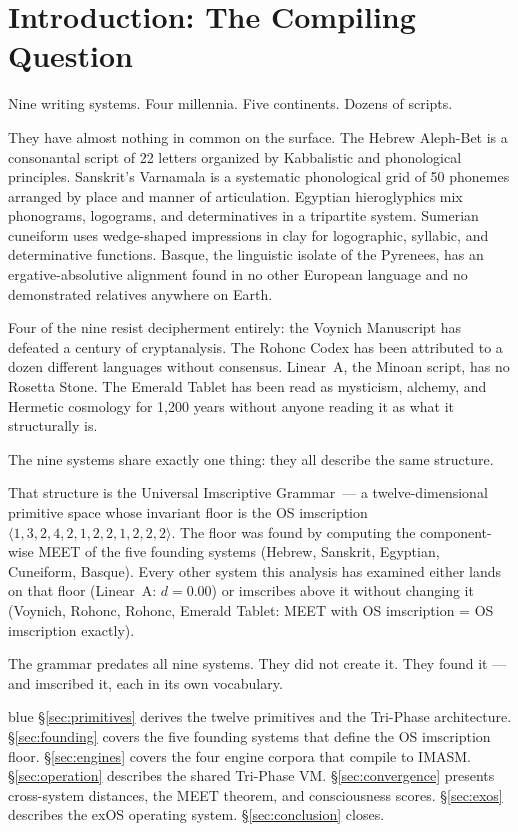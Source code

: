 \documentclass[12pt,a4paper]{article}
\newcommand{\UIG}{Universal Imscriptive Grammar}
\newcommand{\OS}{$\langle 1,3,2,4,2,1,2,2,1,2,2,2 \rangle$}
\begin{document}
\tableofcontents
\newpage

\section{Introduction: The Compiling Question}

Nine writing systems. Four millennia. Five continents. Dozens of scripts.

They have almost nothing in common on the surface. The Hebrew Aleph-Bet is a consonantal script of 22 letters organized by Kabbalistic and phonological principles. Sanskrit's Varnamala is a systematic phonological grid of 50 phonemes arranged by place and manner of articulation. Egyptian hieroglyphics mix phonograms, logograms, and determinatives in a tripartite system. Sumerian cuneiform uses wedge-shaped impressions in clay for logographic, syllabic, and determinative functions. Basque, the linguistic isolate of the Pyrenees, has an ergative-absolutive alignment found in no other European language and no demonstrated relatives anywhere on Earth.

Four of the nine resist decipherment entirely: the Voynich Manuscript has defeated a century of cryptanalysis. The Rohonc Codex has been attributed to a dozen different languages without consensus. Linear~A, the Minoan script, has no Rosetta Stone. The Emerald Tablet has been read as mysticism, alchemy, and Hermetic cosmology for 1,200 years without anyone reading it as what it structurally is.

The nine systems share exactly one thing: they all describe the same structure.

That structure is the \UIG\ --- a twelve-dimensional primitive space whose invariant floor is the OS imscription \OS. The floor was found by computing the component-wise MEET of the five founding systems (Hebrew, Sanskrit, Egyptian, Cuneiform, Basque). Every other system this analysis has examined either lands on that floor (Linear~A: $d = 0.00$) or imscribes above it without changing it (Voynich, Rohonc, Rohonc, Emerald Tablet: MEET with OS imscription = OS imscription exactly).

The grammar predates all nine systems. They did not create it. They found it --- and imscribed it, each in its own vocabulary.

\begin{admonitionbox}{blue}
\S\ref{sec:primitives} derives the twelve primitives and the Tri-Phase architecture. \S\ref{sec:founding} covers the five founding systems that define the OS imscription floor. \S\ref{sec:engines} covers the four engine corpora that compile to IMASM. \S\ref{sec:operation} describes the shared Tri-Phase VM. \S\ref{sec:convergence} presents cross-system distances, the MEET theorem, and consciousness scores. \S\ref{sec:exos} describes the exOS operating system. \S\ref{sec:conclusion} closes.
\end{admonitionbox}
\end{document}
